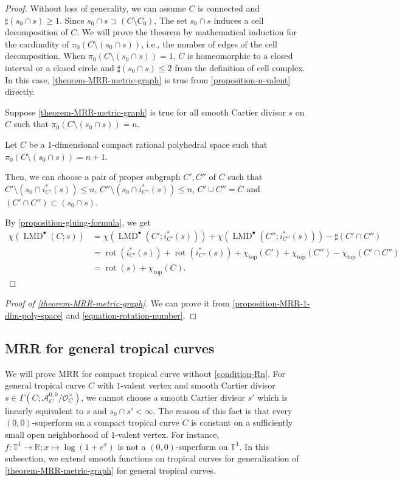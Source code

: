 \documentclass[a4paper,dvipdfmx,reqno,12pt]{amsart}
\theoremstyle{definition}
\newcommand{\opn}[1]{\operatorname{#1}}
\numberwithin{equation}{section}
\begin{document}
\begin{proof}
Without loss of generality, we can assume $C$ is 
connected and $\sharp (s_0\cap s)\geq 1$.
Since $s_0\cap s\supset (C\setminus C_0)$, 
The set $s_0\cap s$ induces a cell decomposition of 
$C$. We will prove the theorem by mathematical 
induction for the cardinality of 
$\pi_0(C\setminus (s_0 \cap s))$, i.e., the 
number of edges of the cell decomposition.
When $\pi_0(C\setminus (s_0 \cap s))=1$, 
$C$ is homeomorphic to a closed interval 
or a closed circle and 
$\sharp (s_0\cap s)\leq 2$ 
from the definition of cell complex.
In this case, \cref{theorem-MRR-metric-graph} is 
true from \cref{proposition-n-valent} directly.

Suppose \cref{theorem-MRR-metric-graph} is true
for all smooth Cartier divisor $s$ on 
$C$ such that $\pi_0(C\setminus (s_0 \cap s))=n$.

Let $C$ be a $1$-dimensional 
compact rational polyhedral space
such that $\pi_0(C\setminus (s_0 \cap s))=n+1$.

Then, we can choose a pair of proper subgraph $C',C''$ of
$C$ such that
$C'\setminus (s_0\cap i^{*}_{C'}(s))\leq n$,
$C''\setminus (s_0\cap i^{*}_{C''}(s))\leq n$,
$C'\cup C''=C$
and $(C'\cap C'')\subset (s_0\cap s)$.

By \cref{proposition-gluing-formula}, we get 
\begin{align*}
\chi(\opn{LMD}^{\bullet}(C;s))
&=\chi(\opn{LMD}^{\bullet}(C';i_{C'}^{*}(s)))
+\chi(\opn{LMD}^{\bullet}(C'';i_{C''}^{*}(s)))
-\sharp(C'\cap C'') \\
&=\opn{rot}(i_{C'}^{*}(s))
+\opn{rot}(i_{C''}^{*}(s))
+\chi_{\opn{top}}(C')+\chi_{\opn{top}}(C'')
-\chi_{\opn{top}}(C'\cap C'') \\
&=\opn{rot}(s)+\chi_{\opn{top}}(C).
\end{align*}

\end{proof}

\begin{proof}[{Proof of \cref{theorem-MRR-metric-graph}}]
We can prove it from \cref{proposition-MRR-1-dim-poly-space}
and \cref{equation-rotation-number}.
\end{proof}


\subsection{MRR for general tropical curves}
\label{section-tropical-curve-general}
We will prove MRR for compact tropical curve 
without \cref{condition-Rn}. 
For general tropical curve $C$ with $1$-valent
vertex and smooth Cartier divisor 
$s\in\Gamma(C;\mathcal{A}^{0,0}_C/\mathcal{O}^{\times}_C)$,
we cannot choose a smooth Cartier divisor $s'$ which
is linearly equivalent to $s$ and $s_0\cap s'<\infty$.
The reason of this fact is that every 
$(0,0)$-superform on a compact tropical curve 
$C$ is constant on a sufficiently
small open neighborhood of $1$-valent vertex.
For instance, 
$f\colon \mathbb{T}^1 \to \mathbb{R}; x\mapsto 
\opn{log}(1+e^{x})$ is not a $(0,0)$-superform
on $\mathbb{T}^{1}$.
In this subsection, we extend smooth functions
on tropical curves for generalization of 
\cref{theorem-MRR-metric-graph} for general 
tropical curves.
\end{document}
